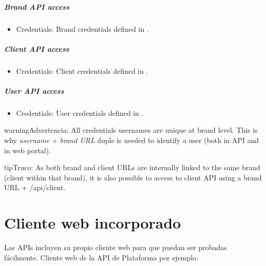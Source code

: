 \documentclass[letterpaper,10pt,spanish]{sphinxmanual}
\begin{document}
\paragraph{Brand API access}
\begin{itemize}
\item {} 
Credentials: Brand credentials defined in {\hyperref[administration_portal/platform/brands:brand\string-operators]{}}.

\end{itemize}
\paragraph{Client API access}
\begin{itemize}
\item {} 
Credentials: Client credentials defined in {\hyperref[administration_portal/brand/clients/operators:client\string-operators]{}}.

\end{itemize}
\paragraph{User API access}
\begin{itemize}
\item {} 
Credentials: User credentials defined in {\hyperref[administration_portal/client/vpbx/users:users]{}}.

\end{itemize}

\begin{notice}{warning}{Advertencia:}
All credentials usernames are unique at brand level. This is why \emph{username + brand URL} duple is needed to
identify a user (both in API and in web portal).
\end{notice}

\begin{notice}{tip}{Truco:}
As both brand and client URLs are internally linked to the same brand (client within that brand), it is also
possible to access to client API using a brand URL + /api/client.
\end{notice}


\chapter{Cliente web incorporado}
\label{api_rest/web_client:built-in-web-client}\label{api_rest/web_client::doc}
Las APIs incluyen su propio cliente web para que puedan ser probadas fácilmente. Cliente web de la API de Plataforma por ejemplo.
\end{document}
